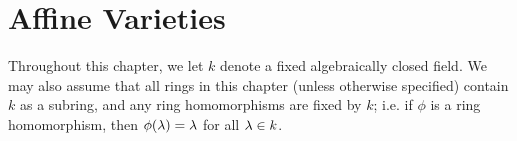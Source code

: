 \chapter{Affine Varieties}\label{chapter_2}

Throughout this chapter, we let $k$ denote a fixed algebraically
closed field. We may also assume that all rings in this chapter
(unless otherwise specified) contain $k$ as a subring, and any ring
homomorphisms are fixed by $k$; i.e. if $\phi$ is a ring
homomorphism, then $\phi(\lambda)=\lambda$ for all $\lambda \in k$.



%
